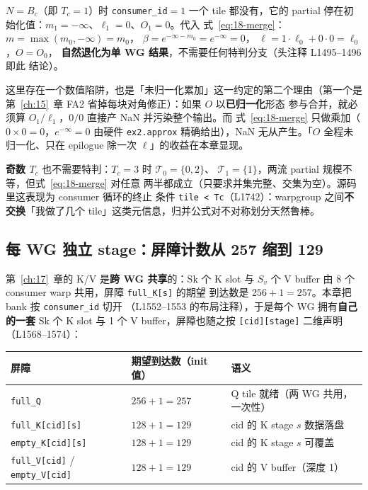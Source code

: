 $N = B_c$（即 $T_c = 1$）时 \texttt{consumer\_id}$=1$ 一个 tile 都没有，它的
partial 停在初始化值：$m_1 = -\infty$、$\ell_1 = 0$、$O_1 = 0$。代入
式~\ref{eq:18-merge}：$m = \max(m_0, -\infty) = m_0$，
$\beta = e^{-\infty - m_0} = e^{-\infty} = 0$，
$\ell = 1 \cdot \ell_0 + 0 \cdot 0 = \ell_0$，$O = O_0$，
\textbf{自然退化为单 WG 结果}，不需要任何特判分支（头注释 L1495--1496 即此
结论）。

这里存在一个数值陷阱，也是「未归一化累加」这一约定的第二个理由（第一个是
第~\ref{ch:15}~章 FA2 省掉每块对角修正）：如果 $O$ 以\textbf{已归一化}形态
参与合并，就必须算 $O_1/\ell_1$，$0/0$ 直接产 NaN 并污染整个输出。而
式~\ref{eq:18-merge} 只做乘加（$0 \times 0 = 0$，$e^{-\infty} = 0$ 由硬件
\texttt{ex2.approx} 精确给出），NaN 无从产生。「$O$ 全程未归一化、只在
epilogue 除一次 $\ell$」的收益在本章显现。

\textbf{奇数 $T_c$} 也不需要特判：$T_c = 3$ 时 $\mathcal{T}_0 = \{0,2\}$、
$\mathcal{T}_1 = \{1\}$，两流 partial 规模不等，但式~\ref{eq:18-merge} 对任意
两半都成立（只要求并集完整、交集为空）。源码里这表现为 consumer 循环的终止
条件 \texttt{tile < Tc}（L1742）：warpgroup 之间\textbf{不交换}「我做了几个
tile」这类元信息，归并公式对不对称划分天然鲁棒。

\subsection{每 WG 独立 stage：屏障计数从 257 缩到 129}

第~\ref{ch:17}~章的 K/V 是\textbf{跨 WG 共享}的：$\mathrm{Sk}$ 个 K slot 与
$S_v$ 个 V buffer 由 8 个 consumer warp 共用，屏障 \texttt{full\_K[s]} 的期望
到达数是 $256 + 1 = 257$。本章把 bank 按 \texttt{consumer\_id} 切开
（L1552--1553 的布局注释），于是每个 WG 拥有\textbf{自己的一套} $\mathrm{Sk}$
个 K slot 与 1 个 V buffer，屏障也随之按 \texttt{[cid][stage]} 二维声明
（L1568--1574）：

\begin{center}
\begin{tabular}{lll}
\toprule
屏障 & 期望到达数（init 值） & 语义 \\
\midrule
\texttt{full\_Q} & $256 + 1 = 257$ & Q tile 就绪（两 WG 共用，一次性） \\
\texttt{full\_\allowbreak{}K[cid][s]} & $128 + 1 = 129$ & cid 的 K stage $s$ 数据落盘 \\
\texttt{empty\_\allowbreak{}K[cid][s]} & $128 + 1 = 129$ & cid 的 K stage $s$ 可覆盖 \\
\texttt{full\_V[cid]} / \texttt{empty\_\allowbreak{}V[cid]} & $128 + 1 = 129$ & cid 的 V buffer（深度 1）\\
\bottomrule
\end{tabular}
\end{center}

